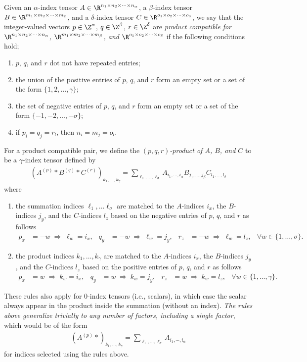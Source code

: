 \documentclass[11pt]{article}
\theoremstyle{remark}
\begin{document}
Given an $\alpha$-index tensor $A\in\R^{n_1\times n_2\times\cdots\times n_\alpha}$, a $\beta$-index tensor
$B\in\R^{m_1\times m_2\times\cdots\times m_\beta}$, and a $\delta$-index tensor $C\in\R^{o_1\times o_2\times\cdots\times o_\delta}$, we
say that the integer-valued vectors $p\in\Z^\alpha$, $q\in\Z^\beta$, $r\in\Z^\delta$ are
\emph{product compatible for $\R^{n_1\times n_2\times\cdots\times n_\alpha}$, $\R^{m_1\times m_2\times\cdots\times m_\beta}$,
  and $\R^{o_1\times o_2\times\cdots\times o_\delta}$} if the following conditions hold;
\begin{enumerate}
\item $p$, $q$, and $r$ dot not have repeated entries;
\item the union of the positive entries of $p$, $q$, and $r$ form an
  empty set or a set of the form $\{1,2,\dots,\gamma\}$;
\item the set of negative entries of $p$, $q$, and $r$ form an empty
  set or a set of the form $\{-1,-2,\dots,-\sigma\}$;
\item if $p_i=q_j=r_l$, then $n_i=m_j=o_l$.
\end{enumerate}
For a product compatible pair, we define the \emph{$(p,q,r)$-product of
  $A$, $B$, and $C$} to be a $\gamma$-index tensor defined by
\begin{align}\label{eq:tprod}
  (A^{(p)} * B^{(q)} * C^{(r)})_{k_1,\dots,k_\gamma}=\sum_{\ell_1,\dots,\ell_\sigma}
  A_{i_1,\cdots,i_\alpha} B_{j_1,\dots,j_\beta} C_{l_1,\dots,l_\delta}
\end{align}
where
\begin{enumerate}
\item the summation indices $\ell_1,\dots\ell_\sigma$ are matched to the
  $A$-indices $i_x$, the $B$-indices $j_y$, and the $C$-indices $l_z$
  based on the negative entries of $p$, $q$, and $r$ as follows
  \begin{align*}
    p_x&=-w\;\Rightarrow\; \ell_w=i_x, &
    q_y&=-w\;\Rightarrow\; \ell_w=j_y, &
    r_z&=-w\;\Rightarrow\; \ell_w=l_z, &
    \forall w\in\{1,\dots,\sigma\}.
  \end{align*}
\item the product indices $k_1,\dots,k_\gamma$ are matched to the
  $A$-indices $i_x$, the $B$-indices $j_y$ , and the $C$-indices $l_z$
  based on the positive entries of $p$, $q$, and $r$ as follows
  \begin{align*}
    p_x&=w\;\Rightarrow\; k_w=i_x, &
    q_y&=w\;\Rightarrow\; k_w=j_y, &
    r_z&=w\;\Rightarrow\; k_w=l_z, &
    \forall w\in\{1,\dots,\gamma\}.
  \end{align*}
\end{enumerate}
These rules also apply for $0$-index tensors (i.e., scalars), in which
case the scalar always appear in the product inside the summation
(without an index). \emph{The rules above generalize trivially to any
  number of factors, including a single factor}, which would be of the form
\begin{align*}
  (A^{(p)} * )_{k_1,\dots,k_\gamma}=\sum_{\ell_1,\dots,\ell_\sigma} A_{i_1,\cdots,i_\alpha} 
\end{align*}
for indices selected using the rules above.
\end{document}
